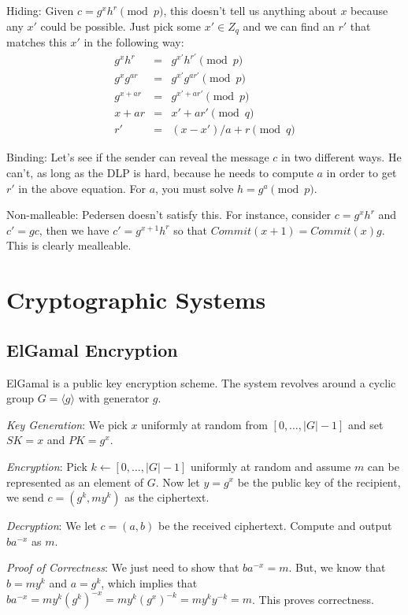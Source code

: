 \documentclass[psamsfonts]{amsart}
\begin{document}
Hiding: Given $c = g^x h^r \pmod{p}$, this doesn't tell us anything about $x$ because any $x'$ could be possible. Just pick some $x' \in Z_q$ and we can find an $r'$ that matches this $x'$ in the following way:
\begin{eqnarray}
  g^{x} h^r &=& g^{x'} h^{r'} \pmod{p} \\
  g^{x} g^{ar} &=& g^{x'} g^{ar'} \pmod{p} \\
    g^{x + ar} &=& g^{x' + ar'} \pmod{p} \\
        x + ar &=& x' + ar' \pmod{q} \\
            r' &=& (x-x')/a + r \pmod{q}
\end{eqnarray}

Binding: Let's see if the sender can reveal the message $c$ in two different ways. He can't, as long as the DLP is hard, because he needs to compute $a$ in order to get $r'$ in the above equation. For $a$, you must solve $h = g^a \pmod{p}$.

Non-malleable: Pedersen doesn't satisfy this. For instance, consider $c = g^x h^r$ and $c' = g c$, then we have $c' = g^{x+1} h^r$ so that $Commit(x+1) = Commit(x)g$. This is clearly mealleable.

\newpage

\section{Cryptographic Systems}

\subsection{ElGamal Encryption}

ElGamal is a public key encryption scheme. The system revolves around a cyclic group $G = \langle g \rangle$ with generator $g$.

\emph{Key Generation}: We pick $x$ uniformly at random from $[0, \ldots, |G|-1]$ and set $SK = x$ and $PK = g^x$.

\emph{Encryption}: Pick $k \leftarrow [0, \ldots, |G|-1]$ uniformly at random and assume $m$ can be represented as an element of $G$. Now let $y = g^x$ be the public key of the recipient, we send $c = (g^k, m y^k)$ as the ciphertext.

\emph{Decryption}: We let $c = (a,b)$ be the received ciphertext. Compute and output $b a^{-x}$ as $m$.

\emph{Proof of Correctness}: We just need to show that $b a^{-x} = m$. But, we know that $b = m y^k$ and $a = g^k$, which implies that $b a^{-x} = m y^k (g^k)^{-x} = m y^k (g^x)^{-k} = m y^k y^{-k} = m$. This proves correctness.
\end{document}
